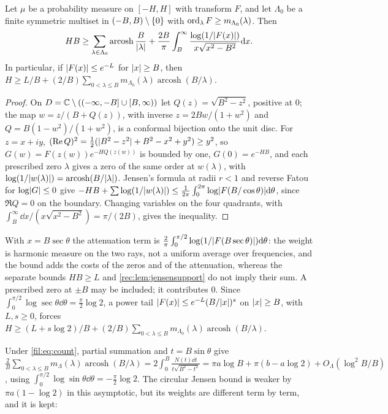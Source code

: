 \begin{theorem}\label{fil:thm:slit}
Let $\mu$ be a probability measure on $[-H,H]$ with transform $F$, and let $\Lambda_0$ be a finite symmetric
multiset in $(-B,B)\setminus\{0\}$ with $\operatorname{ord}_\lambda F\ge m_{\Lambda_0}(\lambda)$. Then
\[
 HB\ge\sum_{\lambda\in\Lambda_0}\operatorname{arcosh}\frac B{\lvert\lambda\rvert}
 +\frac{2B}\pi\int_B^\infty\frac{\log(1/\lvert F(x)\rvert)}{x\sqrt{x^2-B^2}}\mathrm{d} x .
\]
In particular, if $\lvert F(x)\rvert\le e^{-L}$ for $\lvert x\rvert\ge B$, then
$H\ge L/B+(2/B)\sum_{0<\lambda\le B}m_{\Lambda_0}(\lambda)\operatorname{arcosh}(B/\lambda)$.
\end{theorem}

\begin{proof}
On $D=\mathbb{C}\setminus((-\infty,-B]\cup[B,\infty))$ let $Q(z)=\sqrt{B^2-z^2}$, positive at $0$; the map
$w=z/(B+Q(z))$, with inverse $z=2Bw/(1+w^2)$ and $Q=B(1-w^2)/(1+w^2)$, is a conformal bijection onto the unit
disc. For $z=x+iy$, $(\operatorname{Re} Q)^2=\tfrac12(\lvert B^2-z^2\rvert+B^2-x^2+y^2)\ge y^2$, so $G(w)=F(z(w))e^{-HQ(z(w))}$ is
bounded by one, $G(0)=e^{-HB}$, and each prescribed zero $\lambda$ gives a zero of the same order at
$w(\lambda)$, with $\log(1/\lvert w(\lambda)\rvert)=\operatorname{arcosh}(B/\lvert\lambda\rvert)$. Jensen's formula at radii
$r<1$ and reverse Fatou for $\log\lvert G\rvert\le0$ give
$-HB+\sum\log(1/\lvert w(\lambda)\rvert)\le\frac1{2\pi}\int_0^{2\pi}\log\lvert F(B/\cos\theta)\rvert\mathrm{d}\theta$, since
$\Re Q=0$ on the boundary. Changing variables on the four quadrants, with
$\int_B^\infty\dd x/(x\sqrt{x^2-B^2})=\pi/(2B)$, gives the inequality.
\end{proof}

With $x=B\sec\theta$ the attenuation term is $\frac2\pi\int_0^{\pi/2}\log(1/\lvert F(B\sec\theta)\rvert)\mathrm{d}\theta$: the weight is harmonic
measure on the two rays, not a uniform average over frequencies, and the bound adds the costs of the zeros and
of the attenuation, whereas the separate bounds $HB\ge L$ and \cref{rec:lem:jensensupport} do not imply their
sum. A prescribed zero at $\pm B$ may be included; it contributes $0$. Since
$\int_0^{\pi/2}\log\sec\theta\dd\theta=\frac\pi2\log2$, a power tail $\lvert F(x)\rvert\le e^{-L}(B/\lvert x\rvert)^s$ on $\lvert x\rvert\ge B$, with $L,s\ge0$,
forces $H\ge(L+s\log2)/B+(2/B)\sum_{0<\lambda\le B}m_{\Lambda_0}(\lambda)\operatorname{arcosh}(B/\lambda)$.

Under \eqref{fil:eq:count}, partial summation and $t=B\sin\theta$ give
$\frac2B\sum_{0<\lambda\le B}m_\Lambda(\lambda)\operatorname{arcosh}(B/\lambda)=2\int_0^B\frac{N(t)\dd t}{t\sqrt{B^2-t^2}}
=\pi a\log B+\pi(b-a\log2)+O_\Lambda(\log^2B/B)$, using $\int_0^{\pi/2}\log\sin\theta\dd\theta=-\frac\pi2\log2$.
The circular Jensen bound is weaker by $\pi a(1-\log2)$ in this asymptotic, but its weights are different
term by term, and it is kept:

